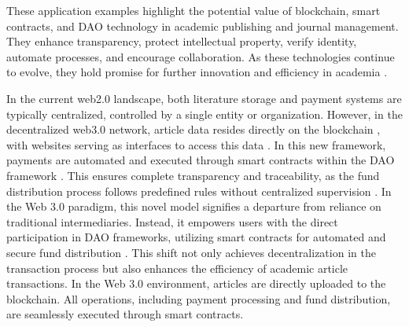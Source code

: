 \documentclass[lettersize,journal]{IEEEtran}
\begin{document}
These application examples highlight the potential value of blockchain, smart contracts, and DAO technology in academic publishing and journal management. They enhance transparency, protect intellectual property, verify identity, automate processes, and encourage collaboration. As these technologies continue to evolve, they hold promise for further innovation and efficiency in academia \cite{vacca2021systematic}.


In the current web2.0 landscape, both literature storage and payment systems are typically centralized, controlled by a single entity or organization. However, in the decentralized web3.0 network, article data resides directly on the blockchain \cite{alabdulwahhab2018web}, with websites serving as interfaces to access this data \cite{10402553} \cite{971982} \cite{6222336}.
In this new framework, payments are automated and executed through smart contracts within the DAO framework \cite{cao2022decentralized}. This ensures complete transparency and traceability, as the fund distribution process follows predefined rules without centralized supervision \cite{10302676}.
In the Web 3.0 paradigm, this novel model signifies a departure from reliance on traditional intermediaries. Instead, it empowers users with the direct participation in DAO frameworks, utilizing smart contracts for automated and secure fund distribution \cite{10302435}. This shift not only achieves decentralization in the transaction process but also enhances the efficiency of academic article transactions.
In the Web 3.0 environment, articles are directly uploaded to the blockchain. All operations, including payment processing and fund distribution, are seamlessly executed through smart contracts.
\end{document}
